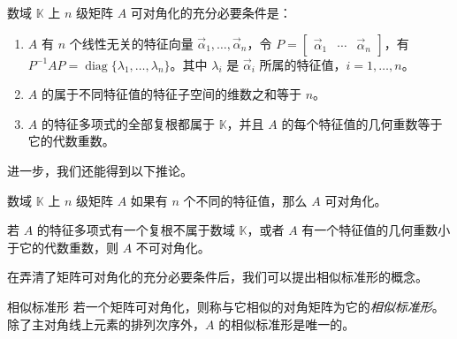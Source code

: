 \begin{theorem}[矩阵可对角化的充分必要条件]
	数域 $\mathbb K$ 上 $n$ 级矩阵 $A$ 可对角化的充分必要条件是：

	\begin{enumerate}
		\item $A$ 有 $n$ 个线性无关的特征向量 $\vec \alpha_1, \ldots, \vec \alpha_n$，令 $P = \begin{bmatrix} \vec \alpha_1 & \cdots & \vec \alpha_n \end{bmatrix}$，有 $P^{-1} A P = \operatorname{diag} \{\lambda_1, \ldots, \lambda_n\}$。其中 $\lambda_i$ 是 $\vec \alpha_i$ 所属的特征值，$i = 1, \ldots, n$。

		\item $A$ 的属于不同特征值的特征子空间的维数之和等于 $n$。

		\item $A$ 的特征多项式的全部复根都属于 $\mathbb K$，并且 $A$ 的每个特征值的几何重数等于它的代数重数。
	\end{enumerate}
\end{theorem}

进一步，我们还能得到以下推论。

\begin{theorem}
	数域 $\mathbb K$ 上 $n$ 级矩阵 $A$ 如果有 $n$ 个不同的特征值，那么 $A$ 可对角化。
\end{theorem}

\begin{theorem}
	若 $A$ 的特征多项式有一个复根不属于数域 $\mathbb K$，或者 $A$ 有一个特征值的几何重数小于它的代数重数，则 $A$ 不可对角化。
\end{theorem}

在弄清了矩阵可对角化的充分必要条件后，我们可以提出相似标准形的概念。

\begin{definition}{相似标准形}
	若一个矩阵可对角化，则称与它相似的对角矩阵为它的\emph{相似标准形}。除了主对角线上元素的排列次序外，$A$ 的相似标准形是唯一的。
\end{definition}

